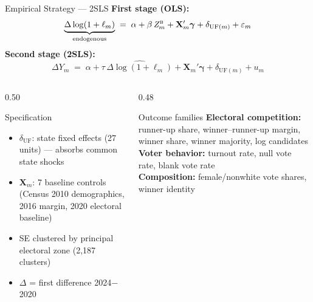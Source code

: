 \documentclass[aspectratio=169,10pt]{beamer}
\newcommand{\bZ}{\mathit{Z}_{m}^{\textsc{b}}}
\begin{document}
\begin{frame}{Empirical Strategy --- 2SLS}
\textbf{First stage (OLS):}
\vspace{-4pt}
\[
\underbrace{\Delta\log(1+\ell_{m})}_{\text{endogenous}} \;=\; \alpha + \beta\,\bZ + \mathbf{X}_m'\boldsymbol{\gamma} + \delta_{\text{UF}(m)} + \varepsilon_m
\]
\vspace{-6pt}
\textbf{Second stage (2SLS):}
\vspace{-4pt}
\[
\Delta Y_m \;=\; \alpha + \tau\,\widehat{\Delta\log(1+\ell_{m})} + \mathbf{X}_m'\boldsymbol{\gamma} + \delta_{\text{UF}(m)} + u_m
\]
\vspace{-4pt}
\begin{columns}[T]
\begin{column}{0.50\textwidth}
\begin{block}{Specification}
  \footnotesize
  \begin{itemize}
    \item $\delta_{\text{UF}}$: state fixed effects (27 units) --- absorbs common state shocks
    \item $\mathbf{X}_m$: 7 baseline controls (Census 2010 demographics, 2016 margin, 2020 electoral baseline)
    \item SE clustered by principal electoral zone (2,187 clusters)
    \item $\Delta$ = first difference 2024$-$2020
  \end{itemize}
\end{block}
\end{column}
\begin{column}{0.48\textwidth}
\begin{alertblock}{Outcome families}
  \footnotesize
  \textbf{Electoral competition:} runner-up share, winner--runner-up margin, winner share, winner majority, log candidates\\[1pt]
  \textbf{Voter behavior:} turnout rate, null vote rate, blank vote rate\\[1pt]
  \textbf{Composition:} female/nonwhite vote shares, winner identity
\end{alertblock}
\end{column}
\end{columns}
\end{frame}
\end{document}
